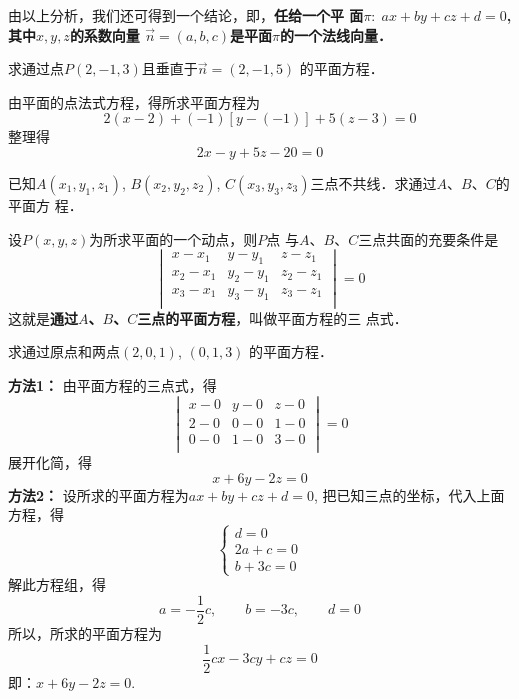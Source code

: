 由以上分析，我们还可得到一个结论，即，\textbf{任给一个平
面$\pi:\; ax+by+cz+d=0$, 其中$x,y,z$的系数向量  
$\vec{n}=(a,b,c)$是平面$\pi$的一个法线向量．
}

\begin{example}
    求通过点$P(2,-1,3)$且垂直于$\vec{n}=(2,-1,5)$
的平面方程．
\end{example}

\begin{solution}
    由平面的点法式方程，得所求平面方程为
\[2(x-2)+(-1)[y-(-1)]+5(z-3)=0\]
整理得
\[2x-y+5z-20=0\]
\end{solution}




\begin{example}
    已知$A(x_1,y_1,z_1)$, $B(x_2,y_2,z_2)$, 
$C(x_3,y_3,z_3)$三点不共线．求通过$A$、$B$、$C$的平面方
程．
\end{example}

\begin{solution}
    设$P(x,y,z)$为所求平面的一个动点，则$P$点
与$A$、$B$、$C$三点共面的充要条件是
\[\begin{vmatrix}
    x-x_1&y-y_1&z-z_1\\
    x_2-x_1&y_2-y_1&z_2-z_1\\
    x_3-x_1&y_3-y_1&z_3-z_1\\
\end{vmatrix}=0\]
这就是\textbf{通过$A$、$B$、$C$三点的平面方程}，叫做平面方程的三
点式．
\end{solution}




\begin{example}
    求通过原点和两点$(2,0,1)$, $(0,1,3)$
的平面方程．
\end{example}

\begin{solution}
\textbf{方法1：} 由平面方程的三点式，得
\[\begin{vmatrix}
x-0&y-0&z-0\\    
2-0&0-0&1-0\\ 
0-0&1-0&3-0\\ 
\end{vmatrix}=0\]
展开化简，得
\[x+6y-2z=0\]
\textbf{方法2：}
设所求的平面方程为$ax+by+cz+d=0$, 
把已知三点的坐标，代入上面方程，得
\[\begin{cases}
    d=0\\
    2a+c=0\\
    b+3c=0
\end{cases}\]
解此方程组，得
\[a=-\frac{1}{2}c,\qquad b=-3c,\qquad d=0\]
所以，所求的平面方程为
\[\frac{1}{2}cx-3cy+cz=0\]
即：$x+6y-2z=0$.
\end{solution}

